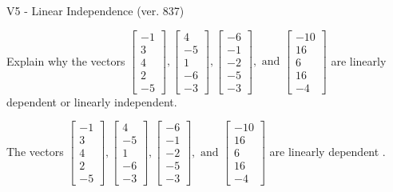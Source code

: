 \begin{exercise}
  \begin{exerciseTitle}V5 - Linear Independence (ver. 837)\end{exerciseTitle}
  \begin{exerciseStatement}
    Explain why the vectors \(\left[\begin{array}{r}
-1 \\
3 \\
4 \\
2 \\
-5
\end{array}\right] , \left[\begin{array}{r}
4 \\
-5 \\
1 \\
-6 \\
-3
\end{array}\right] , \left[\begin{array}{r}
-6 \\
-1 \\
-2 \\
-5 \\
-3
\end{array}\right] , \text{ and } \left[\begin{array}{r}
-10 \\
16 \\
6 \\
16 \\
-4
\end{array}\right]\) are linearly dependent or linearly independent.	


  \end{exerciseStatement}
  \begin{exerciseAnswer}
   The vectors \(\left[\begin{array}{r}
-1 \\
3 \\
4 \\
2 \\
-5
\end{array}\right] , \left[\begin{array}{r}
4 \\
-5 \\
1 \\
-6 \\
-3
\end{array}\right] , \left[\begin{array}{r}
-6 \\
-1 \\
-2 \\
-5 \\
-3
\end{array}\right] , \text{ and } \left[\begin{array}{r}
-10 \\
16 \\
6 \\
16 \\
-4
\end{array}\right]\) are 
  	 linearly dependent  .
  


  \end{exerciseAnswer}
\end{exercise}